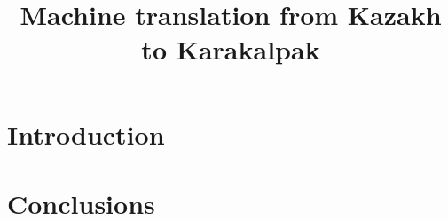 \documentclass[twocolumn,a4]{article}
\title{Machine translation from Kazakh to Karakalpak}
\begin{document}
\section{Introduction}




\section{Conclusions}
\end{document}
